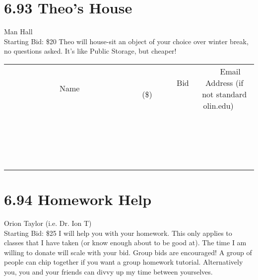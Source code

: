 \documentclass[11pt]{article}
\begin{document}
\section*{6.93 Theo's House}
Man Hall
\\
Starting Bid: \$20
\newline
Theo will house-sit an object of your choice over winter break, no questions asked. It's like Public Storage, but cheaper!
\\[3ex]
\begin{tabular}{c c c}
~~~~~~~~~~~~~Name~~~~~~~~~~~~~ & ~~~~~~~~~Bid (\$)~~~~~~~~~  & ~~~Email Address (if not standard olin.edu)~~~\\
 & & \\
\hline
 & & \\
\hline
 & & \\
\hline
 & & \\
\hline
 & & \\
\hline
 & & \\
\hline
 & & \\
\hline
 & & \\
\hline
 & & \\
\hline
 & & \\
\hline
 & & \\
\hline
 & & \\
\hline
 & & \\
\hline
 & & \\
\hline
 & & \\
\hline
 & & \\
\hline
 & & \\
\hline
 & & \\
\hline
 & & \\
\hline
\end{tabular}
\newpage
\section*{6.94 Homework Help}
Orion Taylor (i.e. Dr. Ion T)
\\
Starting Bid: \$25
\newline
I will help you with your homework. This only applies to classes that I have taken (or know enough about to be good at). The time I am willing to donate will scale with your bid. Group bids are encouraged! A group of people can chip together if you want a group homework tutorial. Alternatively you, you and your friends can divvy up my time between yourselves.
\end{document}

